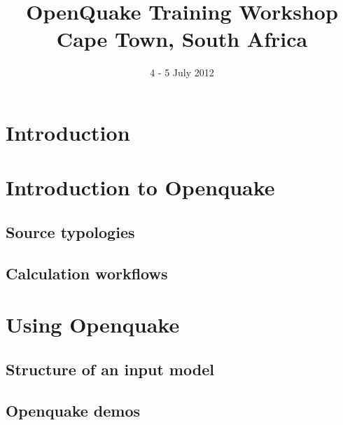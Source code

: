 \documentclass[11pt,a4paper,headings=small,dvips]{scrbook}
\begin{document}
\setcounter{page}{1}

\begin{titlepage}
	\title{ \textcolor{blue01}{\textsf{\bfseries\Huge 
        OpenQuake Training Workshop\\
        Cape Town, South Africa}}}
	\date{4 - 5 July 2012}
	\publishers{GEM Foundation, Pavia}
\end{titlepage}

\pagestyle{scrheadings}
\maketitle
\renewcommand*\thesection{\arabic{section}}
\renewcommand*\thefigure{\thesection.\arabic{figure}}
\clearpage
\chapter*{Introduction}
\cleardoublepage
\tableofcontents
\cleardoublepage
\chapter{Introduction to Openquake}
\section{Source typologies}
\section{Calculation workflows}
\cleardoublepage
\chapter{Using Openquake}
\section{Structure of an input model}
\section{Openquake demos}
\cleardoublepage
\end{document}
